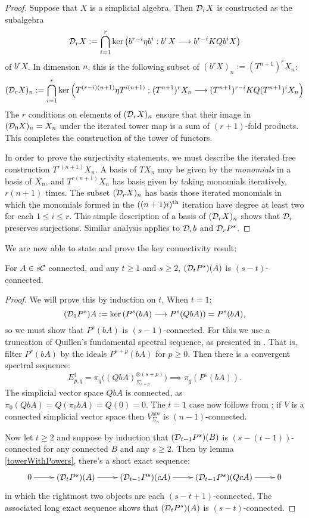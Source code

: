 \documentclass[11pt]{amsart}
\theoremstyle{plain}
\newcommand{\Comm}{\calC}
\newcommand{\caldup}[1]{\calD_{\smash{#1}}}
\begin{document}
\begin{proof}

Suppose that $X$ is a simplicial algebra. Then $\caldup{r}X$
is constructed as the subalgebra
\[\caldup{r}X:= \bigcap_{i=1}^{r}\ker\!\left(b^{r-i}\eta b^{i}:b^{r}X\to b^{r-i}KQb^{i}X\right)\]
of $b^rX$. In dimension $n$, this is the following subset of $(b^rX)_n:=(T^{n+1})^rX_n$:
\[(\caldup{r}X)_n:=\bigcap_{i=1}^{r}\ker\!\left(T^{(r-i)(n+1)}\eta T^{i(n+1)}:(T^{n+1})^rX_n\to (T^{n+1})^{r-i}KQ(T^{n+1})^iX_n\right)\]
The $r$ conditions on elements of $(\caldup{r}X)_n$ ensure that their image in $(\caldup{0}X)_n=X_n$ under the iterated tower map is a sum of $(r+1)$-fold products. This completes the construction of the tower of functors.

In order to prove the surjectivity statements, we must describe the iterated free construction $T^{r(n+1)}X_n$. A basis of $TX_n$ may be given by the \emph{monomials} in a basis of $X_n$, and $T^{r(n+1)}X_n$ has basis given by taking monomials iteratively, $r(n+1)$ times. The subset $(\caldup{r}X)_n$ has basis those iterated monomials in which the monomials formed in the $((n+1)i)^\textup{th}$ iteration have degree at least two for each $1\leq i\leq r$. This simple description of a basis of $(\caldup{r}X)_n$ shows that $\caldup{r}$ preserves surjections. Similar analysis applies to $\caldup{r}b$ and $\caldup{r}P^s$.
\end{proof}
We are now able to state and prove the key connectivity result:
\begin{lem}\label{connectivityOfDerivedPowers}
For $A\in s\Comm$ connected, and any $t\geq1$ and $s\geq2$, $(\caldup{t}P^{s})(A)$ is $(s-t)$-connected.
\end{lem}
\begin{proof}
We will prove this by induction on $t$. When $t=1$:
\[(\caldup{1}P^{s})A:=\ker(P^{s}(bA)\to P^{s}(QbA))=P^{s}(bA),\]
so we must show that $P^s(bA)$ is $(s-1)$-connected. For this we use a truncation of Quillen's fundamental spectral sequence, as presented in \cite[thm 6.2]{MR1089001}. That is, filter $P^s(bA)$ by the ideals $P^{s+p}(bA)$ for $p\geq0$. Then there is a convergent spectral sequence:
\[E^1_{p,q}= \pi_q\bigl((QbA)^{\otimes (s+p)}_{\Sigma_{s+p}}\bigr)\implies \pi_q(P^s(bA)).\]
The simplicial vector space $QbA$ is connected, as $\pi_0(QbA)=Q(\pi_0bA)=Q(0)=0$. The $t=1$ case now follows from \cite[Satz 12.1]{DoldPuppeSuspension.pdf}: if $V$ is a connected simplicial vector space then $V^{\otimes n}_{\Sigma_n}$ is $(n-1)$-connected. 

Now let $t\geq2$ and suppose by induction that $(\caldup{t-1}P^{s})(B)$ is $(s-(t-1))$-connected for any connected $B$ and any $s\geq2$. Then by lemma \ref{towerWithPowers}, there's a short exact sequence:
\[\xymatrix{
0\ar[r]&
(\caldup{t}P^{s})(A)\ar[r]&
(\caldup{t-1}P^{s})(cA)\ar[r]&
(\caldup{t-1}P^{s})(QcA)\ar[r]&
0
}\]
in which the rightmost two objects are each $(s-t+1)$-connected. The associated long exact sequence shows that $(\caldup{t}P^{s})(A)$ is $(s-t)$-connected.
\end{proof}
\end{document}
